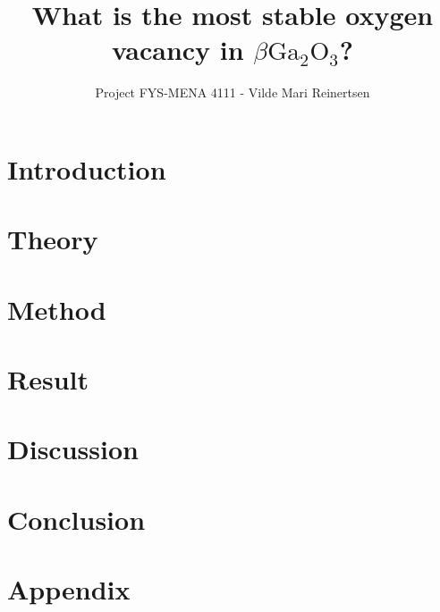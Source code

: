 

\title{What is the most stable oxygen vacancy in $\beta \text{Ga}_2\text{O}_3$?}
\author{Project FYS-MENA 4111 - Vilde Mari Reinertsen}
\raggedbottom



\maketitle

\begin{abstract}

  
\tableofcontents
\end{abstract}

\twocolumn

\section{Introduction}


\section{Theory}


\section{Method}


\section{Result}


\section{Discussion}


\section{Conclusion}


\newpage



\section*{Appendix}



